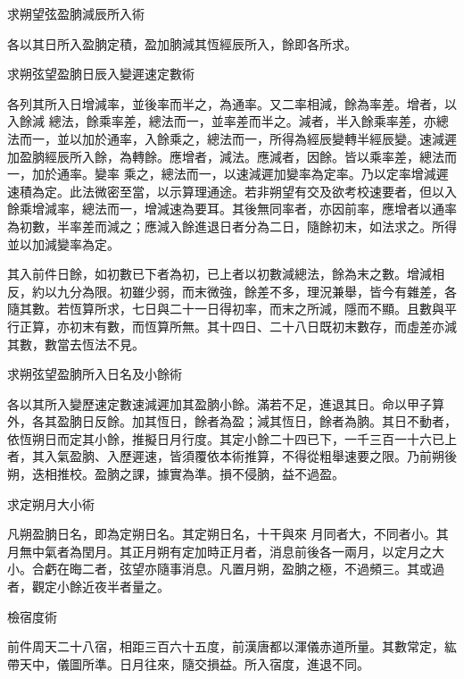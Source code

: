 \begin{pinyinscope}
 求朔望弦盈朒減辰所入術



 各以其日所入盈朒定積，盈加朒減其恆經辰所入，餘即各所求。



 求朔弦望盈朒日辰入變遲速定數術



 各列其所入日增減率，並後率而半之，為通率。又二率相減，餘為率差。增者，以入餘減
 總法，餘乘率差，總法而一，並率差而半之。減者，半入餘乘率差，亦總法而一，並以加於通率，入餘乘之，總法而一，所得為經辰變轉半經辰變。速減遲加盈朒經辰所入餘，為轉餘。應增者，減法。應減者，因餘。皆以乘率差，總法而一，加於通率。變率
 乘之，總法而一，以速減遲加變率為定率。乃以定率增減遲速積為定。此法微密至當，以示算理通途。若非朔望有交及欲考校速要者，但以入餘乘增減率，總法而一，增減速為要耳。其後無同率者，亦因前率，應增者以通率為初數，半率差而減之；應減入餘進退日者分為二日，隨餘初末，如法求之。所得並以加減變率為定。



 其入前件日餘，如初數已下者為初，已上者以初數減總法，餘為末之數。增減相反，約以九分為限。初雖少弱，而末微強，餘差不多，理況兼舉，皆今有雜差，各隨其數。若恆算所求，七日與二十一日得初率，而末之所減，隱而不顯。且數與平行正算，亦初末有數，而恆算所無。其十四日、二十八日既初末數存，而虛差亦減其數，數當去恆法不見。



 求朔弦望盈朒所入日名及小餘術



 各以其所入變歷速定數速減遲加其盈朒小餘。滿若不足，進退其日。命以甲子算外，各其盈朒日反餘。加其恆日，餘者為盈；減其恆日，餘者為朒。其日不動者，依恆朔日而定其小餘，推擬日月行度。其定小餘二十四已下，一千三百一十六已上者，其入氣盈朒、入歷遲速，皆須覆依本術推算，不得從粗舉速要之限。乃前朔後朔，迭相推校。盈朒之課，據實為準。損不侵朒，益不過盈。



 求定朔月大小術



 凡朔盈朒日名，即為定朔日名。其定朔日名，十干與來
 月同者大，不同者小。其月無中氣者為閏月。其正月朔有定加時正月者，消息前後各一兩月，以定月之大小。合虧在晦二者，弦望亦隨事消息。凡置月朔，盈朒之極，不過頻三。其或過者，觀定小餘近夜半者量之。



 檢宿度術



 前件周天二十八宿，相距三百六十五度，前漢唐都以渾儀赤道所量。其數常定，紘帶天中，儀圖所準。日月往來，隨交損益。所入宿度，進退不同。




\end{pinyinscope}

